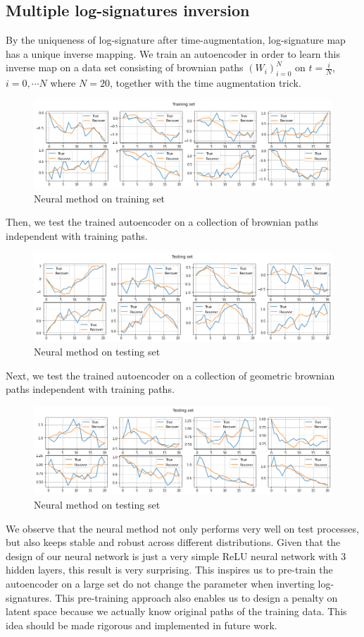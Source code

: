 \documentclass[12pt]{report}
\theoremstyle{definition}
\theoremstyle{remark}
\begin{document}
\subsection{Multiple log-signatures inversion}
By the uniqueness of log-signature after time-augmentation, log-signature map has a unique inverse mapping. We train an autoencoder in order to learn this inverse map on a data set consisting of brownian paths $(W_{i})_{i=0}^{N}$ on $t = \frac{i}{N}$, $i = 0,\cdots N$ where $N = 20$, together with the time augmentation trick. 
 \begin{figure}[H]
  \centering
  \includegraphics[width=\textwidth]{figs/inverse10.png}
  \caption{Neural method on training set }
\end{figure}
Then, we test the trained autoencoder on a collection of brownian paths independent with training paths.
 \begin{figure}[H]
  \centering
  \includegraphics[width=\textwidth]{figs/inverse11.png}
  \caption{Neural method on testing set }
\end{figure}
Next, we test the trained autoencoder on a collection of geometric brownian paths independent with training paths.
 \begin{figure}[H]
  \centering
  \includegraphics[width=\textwidth]{figs/inverse12.png}
  \caption{Neural method on testing set }
\end{figure}
We observe that the neural method not only performs very well on test processes, but also keeps stable and robust across different distributions. Given that the design of our neural network is just a very simple ReLU neural network with 3 hidden layers, this result is very surprising. This inspires us to pre-train the autoencoder on a large set do not change the parameter when inverting log-signatures. This pre-training approach also enables us to design a penalty on latent space because we actually know original paths of the training data. This idea should be made rigorous and implemented in future work. 
\end{document}
